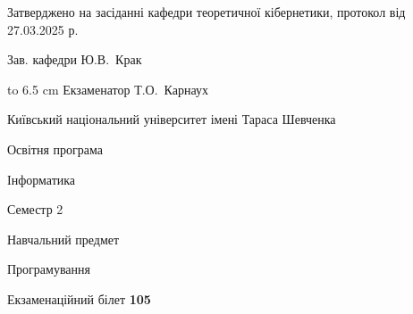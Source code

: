 \documentclass[12pt, ukrainian]{article}
\begin{document}
{\smallskip\smallskip \begin {scriptsize} Затверджено на засіданні кафедри теоретичної кібернетики, протокол   від   27.03.2025 р.\par\smallskip\smallskip\smallskip\smallskip
{\parbox {6.5 cm} {Зав. кафедри \dotfill Ю.В.~Крак}}\hspace {0.7cm} {\hbox to 6.5 cm { Екзаменатор \dotfill Т.О.~Карнаух}} \end{scriptsize}}
\newpage
{{\begin {scriptsize}\par
{ \center  Київський національний університет імені Тараса Шевченка \par}
{\parbox {5 cm}{Освітня програма \hfill}{\parbox {7 cm}{Інформатика\hfill}}\parbox {6 cm}{\hfill Семестр 2}}\par
{\parbox {5 cm} {Навчальний предмет \hfill}\parbox {7 cm}{Програмування \hfill}\parbox {6cm}{\hfill}\par}\vspace{-15pt} \end{scriptsize}}{\center Екзаменаційний білет \No \textbf { 105 }\par}}
\end{document}
